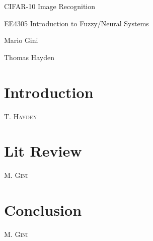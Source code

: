 \documentclass[12pt, a4paper]{article}
\makeatletter
\newcommand{\sectionauthor}[1]{%
  {\parindent0pt\vspace*{-5pt}%
  \linespread{1.1}\large\scshape#1%
  \par\nobreak\vspace*{15pt}}
  \@afterheading%
}
\numberwithin{equation}{section}
\makeatother
\begin{document}
    \begin{titlepage}

    \begin{center}
    \vspace*{6cm}
    \centering
    \Huge
    { CIFAR-10 Image Recognition }
    \vspace{2cm}


    \Large
    {EE4305 Introduction to Fuzzy/Neural Systems}
    \vspace{0.5cm}


    \large
    {Mario Gini

    Thomas Hayden}
    \vfill
    \vspace{0.8cm}
    \end{center}
    \end{titlepage}

    \newpage
    \tableofcontents
    \section{Introduction}
        \pagestyle{tom}
        \sectionauthor{T. Hayden}

    \lipsum[1-3]

    \section{Lit Review}
        \pagestyle{mario}
        \sectionauthor{M. Gini}

    \section{Conclusion}
        \pagestyle{mario}
        \sectionauthor{M. Gini}


    \newpage
    
    
\end{document}
